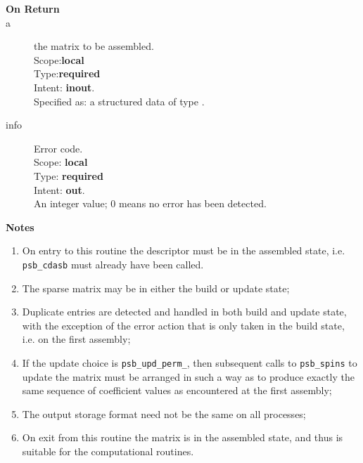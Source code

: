 \begin{description}
\item[\bf On Return]
\item[a] the matrix to be assembled.\\
Scope:{\bf local}\\
Type:{\bf required}\\
Intent: {\bf inout}.\\
Specified as: a structured data of type \spdata.
\item[info] Error code.\\
Scope: {\bf local} \\
Type: {\bf required} \\
Intent: {\bf out}.\\
An integer value; 0 means no error has been detected. 
\end{description}

{\par\noindent\large\bfseries Notes}
\begin{enumerate}
\item On entry to this routine the descriptor must  be in  the
  assembled state, i.e. \verb|psb_cdasb| must already have been called.
\item The sparse matrix may be in either the build or update state;
\item Duplicate entries are detected and handled in both build and
  update state, with the exception of the error action that is only
  taken in the build state, i.e. on the first assembly; 
\item If the update choice is \verb|psb_upd_perm_|, then subsequent
  calls to \verb|psb_spins| to update the matrix must be arranged in
  such a way as to produce exactly the same sequence of coefficient
  values as encountered at the first assembly; 
\item The output storage format need not be the same on all
  processes; 
\item On exit from this routine the matrix is in the assembled state,
  and thus is suitable for the computational routines. 
\end{enumerate}




